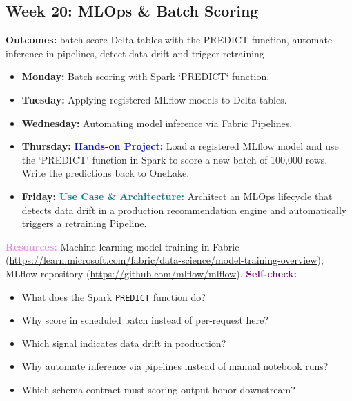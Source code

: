 \documentclass[11pt, a4paper]{article}
\newcommand{\project}[1]{\vspace{1mm}\noindent\textbf{\textcolor{blue}{Hands-on Project:}} #1}
\newcommand{\usecase}[1]{\vspace{1mm}\noindent\textbf{\textcolor{teal}{Use Case \& Architecture:}} #1}
\newcommand{\dayitem}[2]{\item \textbf{#1:} #2}
\newcommand{\resources}[1]{\vspace{1mm}\noindent\textbf{\textcolor{violet}{Resources:}} #1}
\newcommand{\selfcheck}[1]{\vspace{1mm}\noindent\textbf{\textcolor{purple}{Self-check:}} #1}
\begin{document}
\subsection*{Week 20: MLOps \& Batch Scoring}
\par\noindent\textbf{Outcomes:} batch-score Delta tables with the PREDICT function, automate inference in pipelines, detect data drift and trigger retraining
\begin{itemize}[label=-]
    \dayitem{Monday}{Batch scoring with Spark `PREDICT` function.}
    \dayitem{Tuesday}{Applying registered MLflow models to Delta tables.}
    \dayitem{Wednesday}{Automating model inference via Fabric Pipelines.}
    \dayitem{Thursday}{\project{Load a registered MLflow model and use the `PREDICT` function in Spark to score a new batch of 100,000 rows. Write the predictions back to OneLake.}}
    \dayitem{Friday}{\usecase{Architect an MLOps lifecycle that detects data drift in a production recommendation engine and automatically triggers a retraining Pipeline.}}
\end{itemize}
\resources{Machine learning model training in Fabric (\url{https://learn.microsoft.com/fabric/data-science/model-training-overview}); MLflow repository (\url{https://github.com/mlflow/mlflow}).}
\selfcheck{
\begin{itemize}[label=$\bullet$, leftmargin=6mm, itemsep=0pt]
    \item What does the Spark \texttt{PREDICT} function do?
    \item Why score in scheduled batch instead of per-request here?
    \item Which signal indicates data drift in production?
    \item Why automate inference via pipelines instead of manual notebook runs?
    \item Which schema contract must scoring output honor downstream?
\end{itemize}
}
\end{document}
